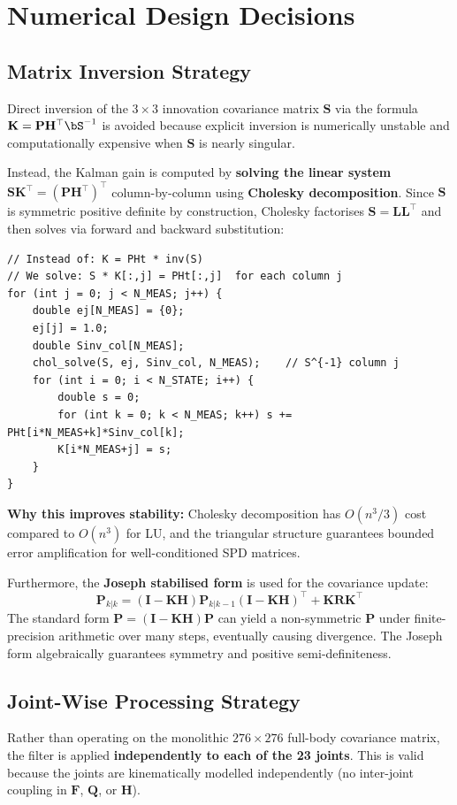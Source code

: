 \documentclass[12pt,a4paper]{article}
\newcommand{\bF}{\mathbf{F}}
\newcommand{\bQ}{\mathbf{Q}}
\newcommand{\bH}{\mathbf{H}}
\newcommand{\bP}{\mathbf{P}}
\newcommand{\bK}{\mathbf{K}}
\newcommand{\bR}{\mathbf{R}}
\newcommand{\bI}{\mathbf{I}}
\begin{document}
\section{Numerical Design Decisions}

\subsection{Matrix Inversion Strategy}
\label{sec:inversion}
Direct inversion of the $3\times3$ innovation covariance matrix $\mathbf{S}$ via
the formula $\bK = \bP\bH^\top\bS^{-1}$ is avoided because explicit inversion is
numerically unstable and computationally expensive when $\mathbf{S}$ is nearly
singular.

Instead, the Kalman gain is computed by \textbf{solving the linear system}
$\mathbf{S}\mathbf{K}^\top = (\bP\bH^\top)^\top$ column-by-column using
\textbf{Cholesky decomposition}. Since $\mathbf{S}$ is symmetric positive definite
by construction, Cholesky factorises $\mathbf{S} = \mathbf{L}\mathbf{L}^\top$
and then solves via forward and backward substitution:

\begin{lstlisting}[caption={Cholesky-based Kalman gain computation}]
// Instead of: K = PHt * inv(S)
// We solve: S * K[:,j] = PHt[:,j]  for each column j
for (int j = 0; j < N_MEAS; j++) {
    double ej[N_MEAS] = {0};
    ej[j] = 1.0;
    double Sinv_col[N_MEAS];
    chol_solve(S, ej, Sinv_col, N_MEAS);    // S^{-1} column j
    for (int i = 0; i < N_STATE; i++) {
        double s = 0;
        for (int k = 0; k < N_MEAS; k++) s += PHt[i*N_MEAS+k]*Sinv_col[k];
        K[i*N_MEAS+j] = s;
    }
}
\end{lstlisting}

\textbf{Why this improves stability:} Cholesky decomposition has $O(n^3/3)$ cost
compared to $O(n^3)$ for LU, and the triangular structure guarantees bounded
error amplification for well-conditioned SPD matrices.

Furthermore, the \textbf{Joseph stabilised form} is used for the covariance update:
\[
    \bP_{k|k} = (\bI-\bK\bH)\bP_{k|k-1}(\bI-\bK\bH)^\top + \bK\bR\bK^\top
\]
The standard form $\bP = (\bI-\bK\bH)\bP$ can yield a non-symmetric $\bP$ under
finite-precision arithmetic over many steps, eventually causing divergence.
The Joseph form algebraically guarantees symmetry and positive semi-definiteness.

\subsection{Joint-Wise Processing Strategy}
Rather than operating on the monolithic $276\times276$ full-body covariance matrix,
the filter is applied \textbf{independently to each of the 23 joints}. This is
valid because the joints are kinematically modelled independently (no
inter-joint coupling in $\bF$, $\bQ$, or $\bH$).
\end{document}
